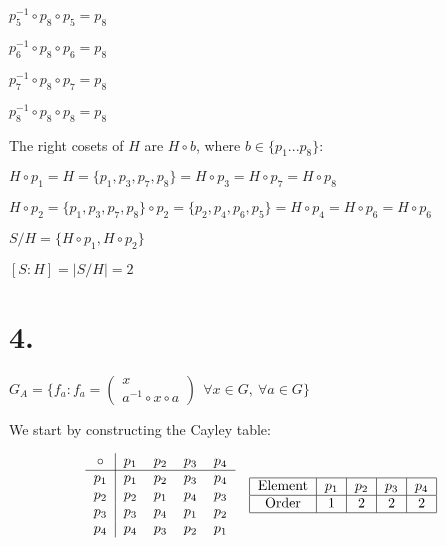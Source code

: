 \documentclass{article}
\begin{document}
$p_5^{-1} \circ p_8 \circ p_5 = p_8$

$p_6^{-1} \circ p_8 \circ p_6 = p_8$

$p_7^{-1} \circ p_8 \circ p_7 = p_8$

$p_8^{-1} \circ p_8 \circ p_8 = p_8$
\newline

\noindent
The right cosets of $H$ are $H \circ b$, where $b \in \{p_1...p_8\}$:

$H \circ p_1 = H = \{p_1,p_3,p_7,p_8 \} = H \circ p_3 = H \circ p_7 = H \circ p_8$
\newline

$H \circ p_2= \{p_1,p_3,p_7,p_8 \} \circ p_2 = \{p_2, p_4, p_6, p_5\} = H \circ p_4 = H \circ p_6 = H \circ p_6$
\newline

\noindent
$S/H = \{ H \circ p_1, H \circ p_2\}$

\noindent
$[S:H] = |S/H| = 2$

\section*{4.}
$G_A = \{f_a: f_a=\begin{pmatrix}
  x \\
  a^{-1} \circ x \circ a
\end{pmatrix}\ \ \forall x \in G, \ \forall a \in G \}$
\newline

\noindent
We start by constructing the Cayley table:

\begin{center}
  \begin{align*}
    \begin{tabular}{c | c c c c}
      $\circ$ & $p_1$ & $p_2$ & $p_3$ & $p_4$ \\
      \cline{1-5}
      {$p_1$} & $p_1$ & $p_2$ & $p_3$ & $p_4$ \\
      {$p_2$} & $p_2$ & $p_1$ & $p_4$ & $p_3$ \\
      {$p_3$} & $p_3$ & $p_4$ & $p_1$ & $p_2$ \\
      {$p_4$} & $p_4$ & $p_3$ & $p_2$ & $p_1$ \\
    \end{tabular} 
    && 
    \begin{tabular}{|c | c|c|c|c|}
      \hline
      Element & $p_1$ & $p_2$ & $p_3$ & $p_4$ \\
      \hline
      Order & 1 & 2 & 2 & 2 \\
      \hline
    \end{tabular}
  \end{align*}
\end{center}
\end{document}
